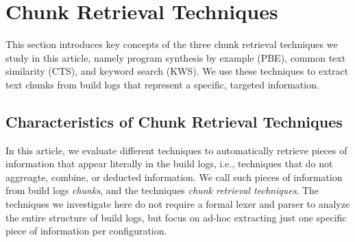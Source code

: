 
\section{Chunk Retrieval Techniques}
\label{sec:techniques}
This section introduces key concepts of the three chunk retrieval
techniques we study in this article, namely program synthesis by
example (PBE), common text similarity (CTS), and keyword search (KWS).
We use these techniques to extract text chunks from build logs that
represent a specific, targeted information.

\subsection{Characteristics of Chunk Retrieval Techniques}
\label{sec:blirt}
In this article, we evaluate different techniques to automatically
retrieve pieces of information that appear literally in the build
logs, i.e., techniques that do not aggreagte, combine, or deducted
information.
We call such pieces of information from build logs
\emph{chunks}, and the techniques \emph{chunk retrieval techniques}.
The techniques we investigate here do not require a formal lexer and
parser to analyze the entire structure of build logs, but focus on
ad-hoc extracting just one specific piece of information per
configuration.

